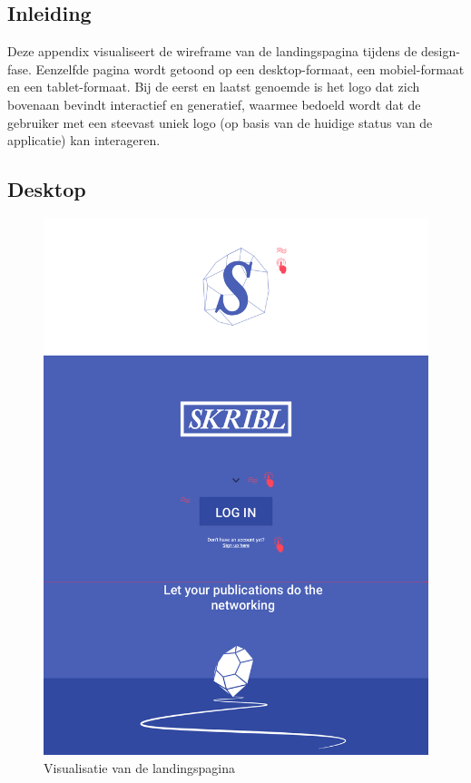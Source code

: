 \documentclass{article}
\begin{document}
\begin{appendices}
\subsection{Inleiding}
Deze appendix visualiseert de wireframe van de landingspagina tijdens de design-fase. Eenzelfde pagina wordt getoond op een desktop-formaat, een mobiel-formaat en een tablet-formaat. Bij de eerst en laatst genoemde is het logo dat zich bovenaan bevindt interactief en generatief, waarmee bedoeld wordt dat de gebruiker met een steevast uniek logo (op basis van de huidige status van de applicatie) kan interageren.

\clearpage

\subsection{Desktop}
\begin{figure}[!h]
\centering
 \includegraphics[width=120mm]{pieteruploads/SKRBL_FRNT_Home.png}
 \caption{Visualisatie van de landingspagina }
\end{figure}


\end{appendices}
\end{document}
